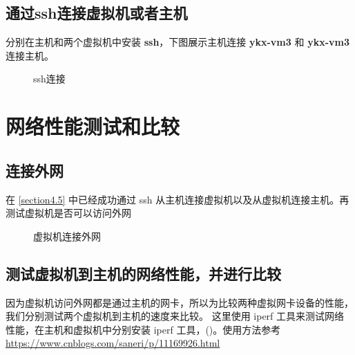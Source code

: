 \documentclass[UTF8,12pt]{ctexart}
\numberwithin{equation}{section}
\begin{document}
\subsection{通过ssh连接虚拟机或者主机} \label{section4.5}
分别在主机和两个虚拟机中安装 \textbf{ssh}，下图展示主机连接 \textbf{ykx-vm3} 和 \textbf{ykx-vm3} 连接主机。
\begin{figure}[H]
    \centering
    \label{ssh}
    \caption{ssh连接}
\end{figure}
\section{网络性能测试和比较}
\subsection{连接外网}
在 \autoref{section4.5} 中已经成功通过 ssh 从主机连接虚拟机以及从虚拟机连接主机。再测试虚拟机是否可以访问外网
\begin{figure}[H]
    \centering
    \label{ssh}
    \caption{虚拟机连接外网}
\end{figure}
\subsection{测试虚拟机到主机的网络性能，并进行比较}
因为虚拟机访问外网都是通过主机的网卡，所以为比较两种虚拟网卡设备的性能，我们分别测试两个虚拟机到主机的速度来比较。
这里使用 iperf 工具来测试网络性能，在主机和虚拟机中分别安装 iperf 工具，(\textbf{\color[RGB]{100,100,235}{sudo apt-get install iperf3}})。使用方法参考 \url{https://www.cnblogs.com/saneri/p/11169926.html}
\end{document}
